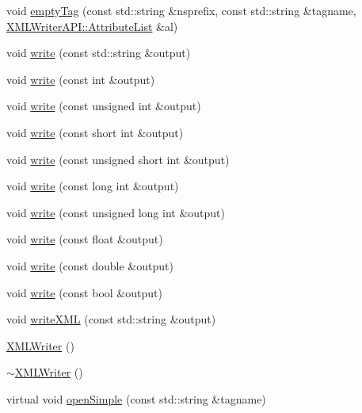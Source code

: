 \begin{DoxyCompactItemize}
\item 
void \mbox{\hyperlink{classADATXML_1_1XMLWriter_a7b356346477d6f2e8e2d2db7553147dc}{empty\+Tag}} (const std\+::string \&nsprefix, const std\+::string \&tagname, \mbox{\hyperlink{namespaceXMLWriterAPI_a28cf3d8051a4ccf0aef208b7ebc66d07}{X\+M\+L\+Writer\+A\+P\+I\+::\+Attribute\+List}} \&al)
\item 
void \mbox{\hyperlink{classADATXML_1_1XMLWriter_a82f1a99241ecd26ea2bd7f3d87364ed7}{write}} (const std\+::string \&output)
\item 
void \mbox{\hyperlink{classADATXML_1_1XMLWriter_aa027c8bf616bdc96982bb11a2610469e}{write}} (const int \&output)
\item 
void \mbox{\hyperlink{classADATXML_1_1XMLWriter_a36ebb7ce3a0fde310c457c9520ca961e}{write}} (const unsigned int \&output)
\item 
void \mbox{\hyperlink{classADATXML_1_1XMLWriter_ab29dc20acb63a2ac633b35cc03e6e58f}{write}} (const short int \&output)
\item 
void \mbox{\hyperlink{classADATXML_1_1XMLWriter_a07c953442846b4d1f2d34b00a9371626}{write}} (const unsigned short int \&output)
\item 
void \mbox{\hyperlink{classADATXML_1_1XMLWriter_a39b29ce03b5b71ef853e1952d1899d73}{write}} (const long int \&output)
\item 
void \mbox{\hyperlink{classADATXML_1_1XMLWriter_a5536c007036f96cc720f38199c3ee6a3}{write}} (const unsigned long int \&output)
\item 
void \mbox{\hyperlink{classADATXML_1_1XMLWriter_adafcb9ed0bb0a4de7a590d877ada4d6f}{write}} (const float \&output)
\item 
void \mbox{\hyperlink{classADATXML_1_1XMLWriter_a54aeec25255feb2aa7063885ca48aa7e}{write}} (const double \&output)
\item 
void \mbox{\hyperlink{classADATXML_1_1XMLWriter_af2cc624cb1450f5b6f430573b626e73e}{write}} (const bool \&output)
\item 
void \mbox{\hyperlink{classADATXML_1_1XMLWriter_a887415a6f26bde42e76af7d831087c7e}{write\+X\+ML}} (const std\+::string \&output)
\item 
\mbox{\hyperlink{classADATXML_1_1XMLWriter_a42bd3e53ee25d35a1034938e1ad6912b}{X\+M\+L\+Writer}} ()
\item 
\mbox{\hyperlink{classADATXML_1_1XMLWriter_aaeb06e39b2a325fb8f33de0dc1fe66c2}{$\sim$\+X\+M\+L\+Writer}} ()
\item 
virtual void \mbox{\hyperlink{classADATXML_1_1XMLWriter_a5599aaa358e07c8c7a4b7a137ec3e43a}{open\+Simple}} (const std\+::string \&tagname)

\end{DoxyCompactItemize}
